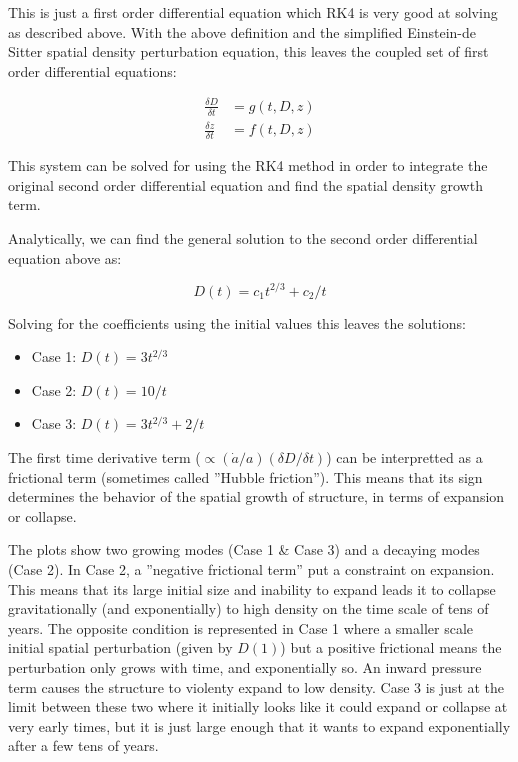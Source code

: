 This is just a first order differential equation which RK4 is very good at solving as described above. With the above definition and the simplified Einstein-de Sitter spatial density perturbation equation, this leaves the coupled set of first order differential equations:

\begin{align*}
  \frac{\delta D}{\delta t} &= g(t,D,z)\\
  \frac{\delta z}{\delta t} &= f(t,D,z)
\end{align*}


This system can be solved for using the RK4 method in order to integrate the original second order differential equation and find the spatial density growth term.

Analytically, we can find the general solution to the second order differential equation above as:

\begin{equation}
  D(t) = c_1t^{2/3}+c_2/t
\end{equation}

Solving for the coefficients using the initial values this leaves the solutions:

\begin{itemize}
  \item Case 1: $D(t) = 3t^{2/3}$ 
  \item Case 2: $D(t) =10/t$
  \item Case 3: $D(t) =  3t^{2/3}+ 2/t$
\end{itemize} 

The first time derivative term ($\propto (\dot{a}/a)(\delta D /\delta t)$) can be interpretted as a frictional term (sometimes called ''Hubble friction''). This means that its sign determines the behavior of the spatial growth of structure, in terms of expansion or collapse.

The plots show two growing modes (Case 1 \& Case 3) and a decaying modes (Case 2). In Case 2, a ''negative frictional term'' put a constraint on expansion. This means that its large initial size and inability to expand leads it to collapse gravitationally (and exponentially) to high density on the time scale of tens of years. The opposite condition is represented in Case 1 where a smaller scale initial spatial perturbation (given by $D(1)$) but a positive frictional means the perturbation only grows with time, and exponentially so. An inward pressure term causes the structure to violenty expand to low density. Case 3 is just at the limit between these two where it initially looks like it could expand or collapse at very early times, but it is just large enough that it wants to expand exponentially after a few tens of years.

